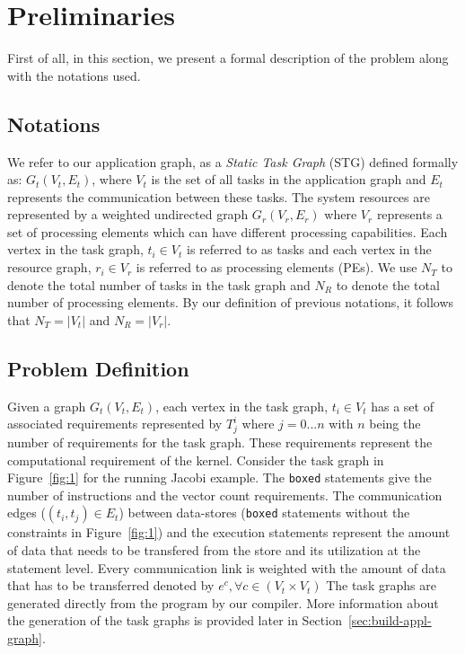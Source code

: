 \documentclass[10pt, conference, compsocconf]{IEEEtran}
\begin{document}
%
\IEEEpeerreviewmaketitle





\section{Preliminaries}

First of all, in this section, we present a formal description of the
problem along with the notations used.

\subsection{Notations}

We refer to our application graph, as a \textit{Static Task Graph} (STG)
defined formally as: $G_t(V_t, E_t)$, where $V_t$ is the set of all
tasks in the application graph and $E_t$ represents the communication
between these tasks. The system resources are represented by a weighted
undirected graph $G_r(V_r, E_r)$ where $V_r$ represents a set of
processing elements which can have different processing
capabilities. Each vertex in the task graph, $t_i \in V_t$ is referred
to as tasks and each vertex in the resource graph, $r_i \in V_r$ is
referred to as processing elements (PEs). We use $N_T$ to denote the
total number of tasks in the task graph and $N_R$ to denote the total
number of processing elements. By our definition of previous notations,
it follows that $N_T = |V_t|$ and $N_R = |V_r|$.

\subsection{Problem Definition}

Given a graph $G_t(V_t, E_t)$, each vertex in the task graph, $t_i \in
V_t$ has a set of associated requirements represented by $T^{i}_{j}$
where $j=0...n$ with $n$ being the number of requirements for the task
graph. These requirements represent the computational requirement of the
kernel. Consider the task graph in Figure~\ref{fig:1} for the running
Jacobi example. The \texttt{boxed} statements give the number of
instructions and the vector count requirements. The communication edges
($(t_i, t_j) \in E_t$) between data-stores (\texttt{boxed} statements
without the constraints in Figure~\ref{fig:1}) and the execution
statements represent the amount of data that needs to be transfered from
the store and its utilization at the statement level. Every
communication link is weighted with the amount of data that has to be
transferred denoted by $e^c, \forall c \in (V_t \times V_t)$ The task
graphs are generated directly from the program by our compiler. More
information about the generation of the task graphs is provided later in
Section~\ref{sec:build-appl-graph}.
\end{document}
